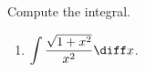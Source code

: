 Compute the integral. 
\begin{enumerate}[ref={\fcProblemRef}]
\item \label{problemintsqrt(1+x^2)/x^2dx} $\displaystyle\int \frac{\sqrt{1+x^2}}{x^2}\diff x$.
\end{enumerate}
